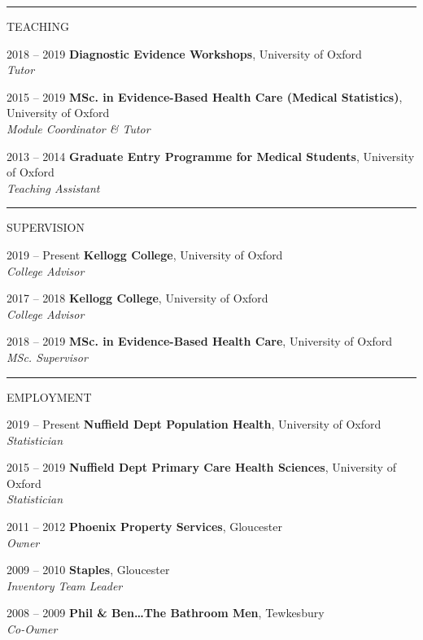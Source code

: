 \documentclass[10pt,a4paper]{article}
\begin{document}
\noindent\rule{\textwidth}{0.4pt}
\begin{cvlist}{TEACHING}
	
	\item[2018 -- 2019]
	\textbf{Diagnostic Evidence Workshops}, University of Oxford \\
	\textit{Tutor}
	
	\item[2015 -- 2019]
	\textbf{MSc. in Evidence-Based Health Care (Medical Statistics)}, University of Oxford \\
	\textit{Module Coordinator \& Tutor}
	
	\item[2013 -- 2014]
	\textbf{Graduate Entry Programme for Medical Students}, University of Oxford \\
	\textit{Teaching Assistant}
	
\end{cvlist}


\noindent\rule{\textwidth}{0.4pt}
\begin{cvlist}{SUPERVISION}
	
	\item[2019 -- Present]
	\textbf{Kellogg College}, University of Oxford \\
	\textit{College Advisor}
	
	\item[2017 -- 2018]
	\textbf{Kellogg College}, University of Oxford \\
	\textit{College Advisor}
	
	\item[2018 -- 2019]
	\textbf{MSc. in Evidence-Based Health Care}, University of Oxford \\
	\textit{MSc. Supervisor}
	
\end{cvlist}


\noindent\rule{\textwidth}{0.4pt}
\begin{cvlist}{EMPLOYMENT}
	
	\item[2019 -- Present]
	\textbf{Nuffield Dept Population Health}, University of Oxford \\
	\textit{Statistician}
	
	\item[2015 -- 2019]
	\textbf{Nuffield Dept Primary Care Health Sciences}, University of Oxford \\
	\textit{Statistician}
	
	\item[2011 -- 2012]
	\textbf{Phoenix Property Services}, Gloucester \\
	\textit{Owner}
	
	\item[2009 -- 2010]
	\textbf{Staples}, Gloucester \\
	\textit{Inventory Team Leader}
	
	\item[2008 -- 2009]
	\textbf{Phil \& Ben\ldots The Bathroom Men}, Tewkesbury \\
	\textit{Co-Owner}
	
\end{cvlist}


\end{document}
